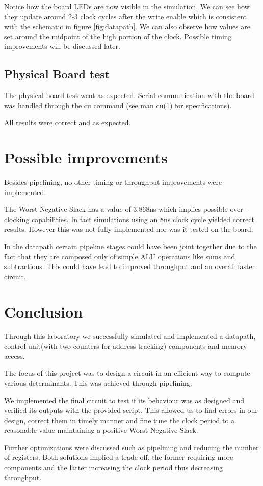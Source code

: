 \documentclass[12pt]{article}
\begin{document}
Notice how the board LEDs are now visible in the simulation. We can see how they update around 2-3 clock cycles after the write enable which is consistent with the schematic in figure \ref{fig:datapath}.
We can also observe how values are set around the midpoint of the high portion of the clock. Possible timing improvements will be discussed later.

\subsection{Physical Board test}
The physical board test went as expected.
Serial communication with the board was handled through the cu command (see man cu(1) for specifications).

All results were correct and as expected.

\section{Possible improvements}
Besides pipelining, no other timing or throughput improvements were implemented.

The Worst Negative Slack has a value of 3.868ns which implies possible over-clocking capabilities. In fact simulations using an 8ns clock cycle yielded correct results. However this was not fully implemented nor was it tested on the board.

In the datapath certain pipeline stages could have been joint together due to the fact that they are composed only of simple ALU operations like sums and subtractions. This could have lead to improved throughput and an overall faster circuit.

\section{Conclusion}
Through this laboratory we successfully simulated and implemented a datapath, control unit(with two counters for address tracking) components and memory access.

The focus of this project was to design a circuit in an efficient way to compute various determinants. This was achieved through pipelining.
  
We implemented the final circuit to test if its behaviour was as designed and verified its outputs with the provided script. This allowed us to
find errors in our design, correct them in timely manner and fine tune the clock period to a reasonable value maintaining a positive Worst Negative Slack.

Further optimizations were discussed such as pipelining and reducing the number of registers. Both solutions implied a trade-off, the former requiring more components and the latter increasing the clock period thus decreasing throughput.

\printbibliography
\end{document}
